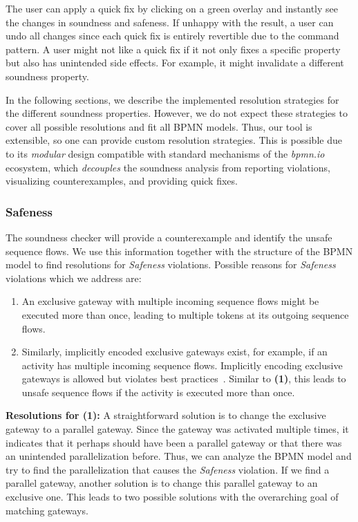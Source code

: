 \documentclass[runningheads]{llncs}
\begin{document}
The user can apply a quick fix by clicking on a green overlay and instantly see the changes in soundness and safeness.
If unhappy with the result, a user can undo all changes since each quick fix is entirely revertible due to the command pattern.
A user might not like a quick fix if it not only fixes a specific property but also has unintended side effects.
For example, it might invalidate a different soundness property.

In the following sections, we describe the implemented resolution strategies for the different soundness properties.
However, we do not expect these strategies to cover all possible resolutions and fit all BPMN models.
Thus, our tool is extensible, so one can provide custom resolution strategies.
This is possible due to its \textit{modular} design compatible with standard mechanisms of the \textit{bpmn.io} ecosystem, which \textit{decouples} the soundness analysis from reporting violations, visualizing counterexamples, and providing quick fixes.

\subsubsection{Safeness}
The soundness checker will provide a counterexample and identify the unsafe sequence flows.
We use this information together with the structure of the BPMN model to find resolutions for \textit{Safeness} violations.
Possible reasons for \textit{Safeness} violations which we address are:

\begin{enumerate}
	\item An exclusive gateway with multiple incoming sequence flows might be executed more than once, leading to multiple tokens at its outgoing sequence flows.
	\item Similarly, implicitly encoded exclusive gateways exist, for example, if an activity has multiple incoming sequence flows.
	Implicitly encoding exclusive gateways is allowed but violates best practices~\cite{camundaservicesgmbhBpmnlint2024}.
	Similar to \textbf{(1)}, this leads to unsafe sequence flows if the activity is executed more than once.
\end{enumerate}


\textbf{Resolutions for (1):} A straightforward solution is to change the exclusive gateway to a parallel gateway.
Since the gateway was activated multiple times, it indicates that it perhaps should have been a parallel gateway or that there was an unintended parallelization before.
Thus, we can analyze the BPMN model and try to find the parallelization that causes the \textit{Safeness} violation.
If we find a parallel gateway, another solution is to change this parallel gateway to an exclusive one.
This leads to two possible solutions with the overarching goal of matching gateways.
\end{document}

